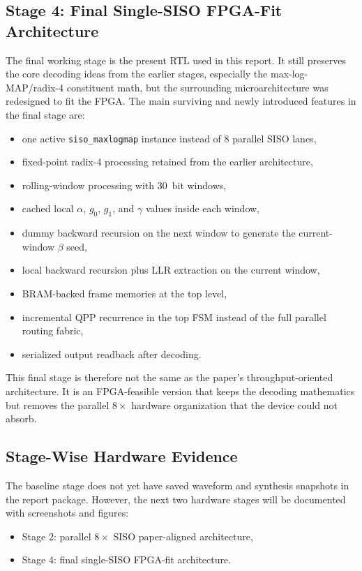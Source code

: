 \documentclass[conference]{IEEEtran}
\begin{document}
\subsection{Stage 4: Final Single-SISO FPGA-Fit Architecture}
The final working stage is the present RTL used in this report. It still preserves the core decoding ideas from the earlier stages, especially the max-log-MAP/radix-4 constituent math, but the surrounding microarchitecture was redesigned to fit the FPGA. The main surviving and newly introduced features in the final stage are:
\begin{itemize}
\item one active \texttt{siso\_maxlogmap} instance instead of \(8\) parallel SISO lanes,
\item fixed-point radix-4 processing retained from the earlier architecture,
\item rolling-window processing with \SI{30}{bit} windows,
\item cached local \(\alpha\), \(g_0\), \(g_1\), and \(\gamma\) values inside each window,
\item dummy backward recursion on the next window to generate the current-window \(\beta\) seed,
\item local backward recursion plus LLR extraction on the current window,
\item BRAM-backed frame memories at the top level,
\item incremental QPP recurrence in the top FSM instead of the full parallel routing fabric,
\item serialized output readback after decoding.
\end{itemize}

This final stage is therefore not the same as the paper's throughput-oriented architecture. It is an FPGA-feasible version that keeps the decoding mathematics but removes the parallel \(8\times\) hardware organization that the device could not absorb.

\subsection{Stage-Wise Hardware Evidence}
The baseline stage does not yet have saved waveform and synthesis snapshots in the report package. However, the next two hardware stages will be documented with screenshots and figures:
\begin{itemize}
\item Stage 2: parallel \(8\times\) SISO paper-aligned architecture,
\item Stage 4: final single-SISO FPGA-fit architecture.
\end{itemize}
\end{document}
